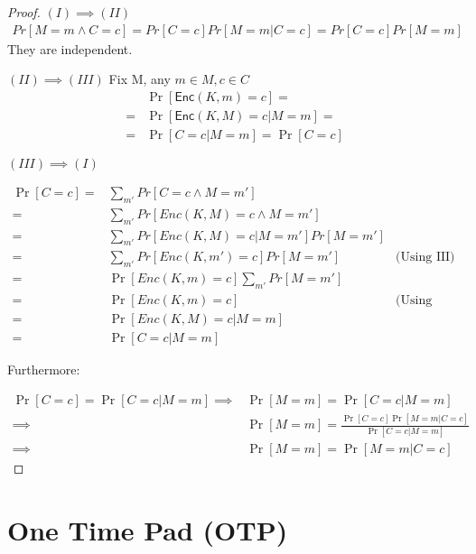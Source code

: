 \begin{proof}

    $(I)\implies(II)$
    \begin{gather*}
        Pr[M=m \wedge C=c]=Pr[C=c]Pr[M=m|C=c]=Pr[C=c]Pr[M=m]   
    \end{gather*}
    They are independent.
    
    $(II)\implies(III)$
    Fix M, any $m\in M, c\in C$
    \begin{align*}
        &\Pr[\textsf{Enc}(K,m)=c]= \\
        =&\Pr[\textsf{Enc}(K,M)=c|M=m]= \\
        =&\Pr[C=c|M=m]=\Pr[C=c]   
    \end{align*}

    $(III)\implies(I)$
    
    \begin{align*}
        \Pr[C=c] =& \sum_{m'}Pr[C=c\wedge M=m'] & \\
        =& \sum_{m'}Pr[Enc(K,M)=c\wedge M=m'] & \\
        =& \sum_{m'}Pr[Enc(K,M)=c| M=m']Pr[M=m'] & \\
        =& \sum_{m'}Pr[Enc(K,m')=c]Pr[M=m'] & \text{(Using III)} \\
        =& \Pr[Enc(K,m)=c]\sum_{m'}Pr[M=m'] & \\
        =& \Pr[Enc(K,m)=c] & \text{(Using total prob.)} \\
        =& \Pr[Enc(K,M)=c|M=m] & \\
        =& \Pr[C=c|M=m] &
    \end{align*}

    Furthermore:

    \begin{align*}
        \Pr[C=c] = \Pr[C=c|M=m] \implies& \Pr[M=m] = \Pr[C=c|M=m] \\
        \implies& \Pr[M=m] = \frac{\Pr[C=c]\Pr[M=m|C=c]}{\Pr[C=c|M=m]} \\
        \implies& \Pr[M=m] = \Pr[M=m|C=c]
    \end{align*}

\end{proof}

\section{One Time Pad (OTP)}


